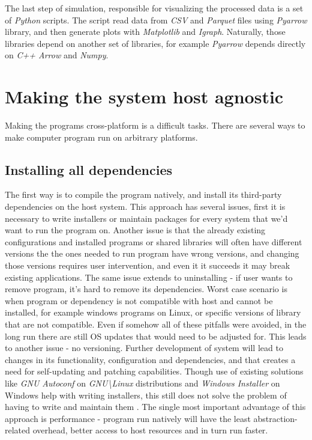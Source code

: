 The last step of simulation, responsible for visualizing the processed data is a set of \textit{Python} scripts. The script read data from \textit{CSV} and \textit{Parquet} files using \textit{Pyarrow} library, and then generate plots with \textit{Matplotlib} and \textit{Igraph}. Naturally, those libraries depend on another set of libraries, for example \textit{Pyarrow} depends directly on \textit{C++ Arrow} and \textit{Numpy}. 
\newpage
\section{Making the system host agnostic}
Making the programs cross-platform is a difficult tasks. There are several ways to make computer program run on arbitrary platforms.
\subsection{Installing all dependencies}
The first way is to compile the program natively, and install its third-party dependencies on the host system. This approach has several issues, first it is necessary to write installers or maintain packages for every system that we'd want to run the program on. Another issue is that the already existing configurations and installed programs or shared libraries will often have different versions the the ones needed to run program have wrong versions, and changing those versions requires user intervention, and even it it succeeds it may break existing applications. The same issue extends to uninstalling - if user wants to remove program, it's hard to remove its dependencies. Worst case scenario is when program or dependency is not compatible with host and cannot be installed, for example windows programs on Linux, or specific versions of library that are not compatible. Even if somehow all of these pitfalls were avoided, in the long run there are still OS updates that would need to be adjusted for. This leads to another issue - no versioning. Further development of system will lead to changes in its functionality, configuration and dependencies, and that creates a need for self-updating and patching capabilities. Though use of existing solutions like \textit{GNU Autoconf} on \textit{GNU\textbackslash Linux} distributions and \textit{Windows Installer} on Windows help with writing installers, this still does not solve the problem of having to write and maintain them \cite{MacKenzie2015, Wilson2004}.
The single most important advantage of this approach is performance - program run natively will have the least abstraction-related overhead, better access to host resources and in turn run faster. 
